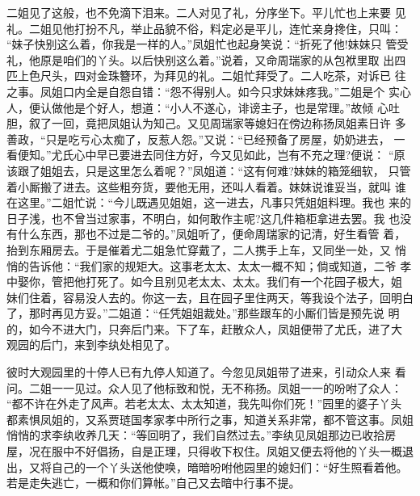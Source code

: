 二姐见了这般，也不免滴下泪来。二人对见了礼，分序坐下。平儿忙也上来要
见礼。二姐见他打扮不凡，举止品貌不俗，料定必是平儿，连忙亲身搀住，只叫：
“妹子快别这么着，你我是一样的人。”凤姐忙也起身笑说：“折死了他!妹妹只
管受礼，他原是咱们的丫头。以后快别这么着。”说着，又命周瑞家的从包袱里取
出四匹上色尺头，四对金珠簪环，为拜见的礼。二姐忙拜受了。二人吃茶，对诉已
往之事。凤姐口内全是自怨自错：“怨不得别人。如今只求妹妹疼我。”二姐是个
实心人，便认做他是个好人，想道：“小人不遂心，诽谤主子，也是常理。”故倾
心吐胆，叙了一回，竟把凤姐认为知己。又见周瑞家等媳妇在傍边称扬凤姐素日许
多善政，“只是吃亏心太痴了，反惹人怨。”又说：“已经预备了房屋，奶奶进去，
一看便知。”尤氏心中早已要进去同住方好，今又见如此，岂有不充之理?便说：
“原该跟了姐姐去，只是这里怎么着呢？”凤姐道：“这有何难?妹妹的箱笼细软，
只管着小厮搬了进去。这些粗夯货，要他无用，还叫人看着。妹妹说谁妥当，就叫
谁在这里。”二姐忙说：“今儿既遇见姐姐，这一进去，凡事只凭姐姐料理。我也
来的日子浅，也不曾当过家事，不明白，如何敢作主呢?这几件箱柜拿进去罢。我
也没有什么东西，那也不过是二爷的。”凤姐听了，便命周瑞家的记清，好生看管
着，抬到东厢房去。于是催着尤二姐急忙穿戴了，二人携手上车，又同坐一处，又
悄悄的告诉他：“我们家的规矩大。这事老太太、太太一概不知；倘或知道，二爷
孝中娶你，管把他打死了。如今且别见老太太、太太。我们有一个花园子极大，姐
妹们住着，容易没人去的。你这一去，且在园子里住两天，等我设个法子，回明白
了，那时再见方妥。”二姐道：“任凭姐姐裁处。”那些跟车的小厮们皆是预先说
明的，如今不进大门，只奔后门来。下了车，赶散众人，凤姐便带了尤氏，进了大
观园的后门，来到李纨处相见了。

彼时大观园里的十停人已有九停人知道了。今忽见凤姐带了进来，引动众人来
看问。二姐一一见过。众人见了他标致和悦，无不称扬。凤姐一一的吩咐了众人：
“都不许在外走了风声。若老太太、太太知道，我先叫你们死！”园里的婆子丫头
都素惧凤姐的，又系贾琏国孝家孝中所行之事，知道关系非常，都不管这事。凤姐
悄悄的求李纨收养几天：“等回明了，我们自然过去。”李纨见凤姐那边已收拾房
屋，况在服中不好倡扬，自是正理，只得收下权住。凤姐又便去将他的丫头一概退
出，又将自己的一个丫头送他使唤，暗暗吩咐他园里的媳妇们：“好生照看着他。
若是走失逃亡，一概和你们算帐。”自己又去暗中行事不提。

